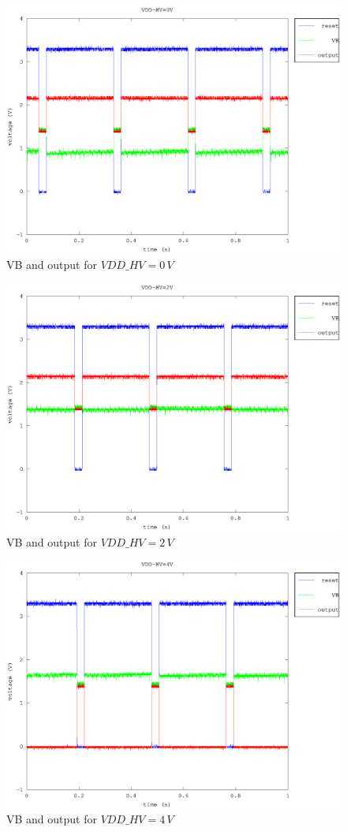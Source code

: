 \documentclass{article}
\begin{document}
\begin{figure}[H]
	\centering
	\includegraphics[width=0.8\linewidth]{fig/VB_0V.eps}
	\caption{VB and output for $VDD\_HV=0\,V$}
	\label{fig:VB_0V}
\end{figure}

\begin{figure}[H]
	\centering
	\includegraphics[width=0.8\linewidth]{fig/VB_2V.eps}
	\caption{VB and output for $VDD\_HV=2\,V$}
	\label{fig:VB_2V}
\end{figure}

\begin{figure}[H]
	\centering
	\includegraphics[width=0.8\linewidth]{fig/VB_4V.eps}
	\caption{VB and output for $VDD\_HV=4\,V$}
	\label{fig:VB_4V}
\end{figure}
\end{document}
